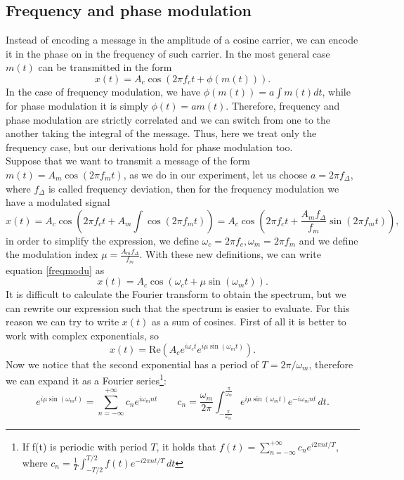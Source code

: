\documentclass[a4paper,10pt]{article}
\begin{document}
\subsection{Frequency and phase modulation}
Instead of encoding a message in the amplitude of a cosine carrier, we can encode it in the phase on in the frequency of such carrier. In the most general case $m(t)$ can be transmitted in the form
\[x(t) = A_c \cos(2\pi f_ct + \phi(m(t))).\]
In the case of frequency modulation, we have $\phi(m(t))= a \int m(t)dt$, while for phase modulation it is simply $\phi(t) = a m(t)$. Therefore, frequency and phase modulation are strictly correlated and we can switch from one to the another taking the integral of the message. Thus, here we treat only the frequency case, but our derivations hold for phase modulation too. \\
Suppose that we want to transmit a message of the form $m(t) = A_m \cos (2\pi f_mt)$, as we do in our experiment, let us choose $a = 2\pi f_\Delta$, where $f_\Delta$ is called frequency deviation, then for the frequency modulation we have a modulated signal
\begin{equation}\label{freqmodu}x(t) = A_c \cos\left(2\pi f_ct + A_m \int \cos (2\pi f_mt)\right) =  A_c \cos\left(2\pi f_ct + \frac{A_m f_\Delta }{f_m }\sin (2\pi f_mt)\right), \end{equation}
in order to simplify the expression, we define $\omega_c = 2\pi f_c,\omega_m = 2\pi f_m$ and we define the modulation index $\mu = \displaystyle\frac{A_m f_\Delta }{f_m }$. With these new definitions, we can write equation \eqref{freqmodu} as
\[x(t) =  A_c \cos\left(\omega_ct + \mu\sin (\omega_mt)\right).\]
It is difficult to calculate the Fourier transform to obtain the spectrum, but we can rewrite our expression such that the spectrum is easier to evaluate. For this reason we can try to write $x(t)$ as a sum of cosines. First of all it is better to work with complex exponentials, so
\begin{equation}\label{complexform}x(t) = \text{Re}\left(A_c e^{i\omega_c t}e^{i\mu \sin(\omega_m t)}\right).\end{equation}
Now we notice that the second exponential has a period of $T = 2\pi/\omega_m$, therefore we can expand it as a Fourier series\footnote{If f(t) is periodic with period $T$, it holds that $f(t) = \displaystyle\sum_{n=-\infty}^{+\infty} c_n e^{i2\pi n t/T}$, where $c_n = \frac{1}{T}\displaystyle\int_{-T/2}^{T/2}f(t)e^{-i2\pi n t/T}\,dt$}:
\[e^{i\mu \sin(\omega_m t)} = \sum_{n=-\infty}^{+\infty }c_n e^{i\omega_mn t} \qquad c_n=\frac{\omega_m}{2\pi}\int_{-\frac{\pi}{\omega_m}}^{\frac{\pi}{\omega_m}}e^{i\mu \sin(\omega_m t)}e^{-i\omega_mnt}\,dt.\]
\end{document}
